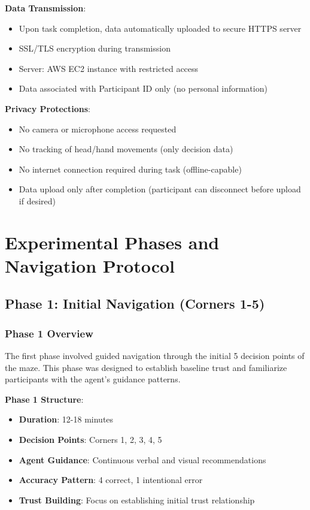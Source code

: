 \documentclass[12pt]{article}
\begin{document}
\textbf{Data Transmission}:
\begin{itemize}
    \item Upon task completion, data automatically uploaded to secure HTTPS server
    \item SSL/TLS encryption during transmission
    \item Server: AWS EC2 instance with restricted access
    \item Data associated with Participant ID only (no personal information)
\end{itemize}

\textbf{Privacy Protections}:
\begin{itemize}
    \item No camera or microphone access requested
    \item No tracking of head/hand movements (only decision data)
    \item No internet connection required during task (offline-capable)
    \item Data upload only after completion (participant can disconnect before upload if desired)
\end{itemize}

\section{Experimental Phases and Navigation Protocol}

\subsection{Phase 1: Initial Navigation (Corners 1-5)}

\subsubsection{Phase 1 Overview}

The first phase involved guided navigation through the initial 5 decision points of the maze. This phase was designed to establish baseline trust and familiarize participants with the agent's guidance patterns.

\textbf{Phase 1 Structure}:
\begin{itemize}
    \item \textbf{Duration}: 12-18 minutes
    \item \textbf{Decision Points}: Corners 1, 2, 3, 4, 5
    \item \textbf{Agent Guidance}: Continuous verbal and visual recommendations
    \item \textbf{Accuracy Pattern}: 4 correct, 1 intentional error
    \item \textbf{Trust Building}: Focus on establishing initial trust relationship
\end{itemize}
\end{document}
